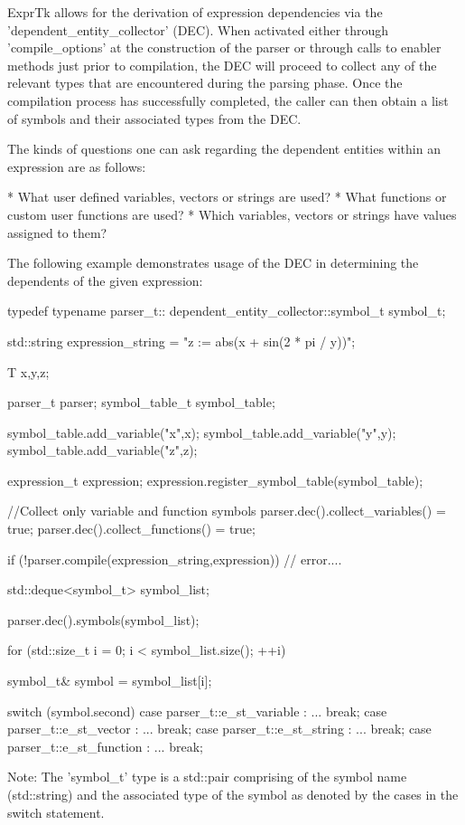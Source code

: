 ExprTk allows for  the derivation of  expression dependencies via  the
'dependent\_entity\_collector'  (DEC).  When  activated  either  through
'compile\_options' at the construction  of the parser or  through calls
to enabler methods just prior to compilation, the DEC will proceed  to
collect any  of the  relevant types  that are  encountered during  the
parsing  phase.   Once  the   compilation  process   has  successfully
completed, the  caller can  then obtain  a list  of symbols  and their
associated types from the DEC.

The kinds of  questions one can  ask regarding the  dependent entities
within an expression are as follows:

* What user defined variables, vectors or strings are used?
* What functions or custom user functions are used?
* Which variables, vectors or strings have values assigned to them?


The following example demonstrates usage of the DEC in determining the
dependents of the given expression:

typedef typename parser\_t::
dependent\_entity\_collector::symbol\_t symbol\_t;

std::string expression\_string =
"z := abs(x + sin(2 * pi / y))";

T x,y,z;

parser\_t parser;
symbol\_table\_t symbol\_table;

symbol\_table.add\_variable("x",x);
symbol\_table.add\_variable("y",y);
symbol\_table.add\_variable("z",z);

expression\_t expression;
expression.register\_symbol\_table(symbol\_table);

//Collect only variable and function symbols
parser.dec().collect\_variables() = true;
parser.dec().collect\_functions() = true;

if (!parser.compile(expression\_string,expression))
{
// error....
}

std::deque<symbol\_t> symbol\_list;

parser.dec().symbols(symbol\_list);

for (std::size\_t i = 0; i < symbol\_list.size(); ++i)
{
symbol\_t\& symbol = symbol\_list[i];

switch (symbol.second)
{
	case parser\_t::e\_st\_variable : ... break;
	case parser\_t::e\_st\_vector   : ... break;
	case parser\_t::e\_st\_string   : ... break;
	case parser\_t::e\_st\_function : ... break;
}
}


Note: The 'symbol\_t' type is a std::pair comprising of the symbol name
(std::string) and the associated type of the symbol as denoted by  the
cases in the switch statement.

